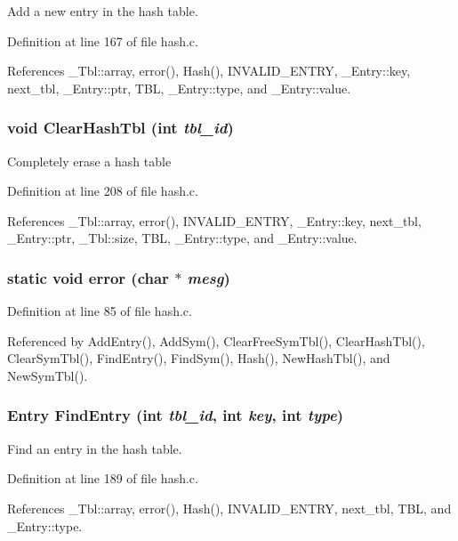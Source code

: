 Add a new entry in the hash table. 

Definition at line 167 of file hash.c.

References \_\-Tbl::array, error(), Hash(), INVALID\_\-ENTRY, \_\-Entry::key, next\_\-tbl, \_\-Entry::ptr, TBL, \_\-Entry::type, and \_\-Entry::value.
\subsubsection{\setlength{\rightskip}{0pt plus 5cm}void Clear\-Hash\-Tbl (int {\em tbl\_\-id})}\label{hash_8c_5004e15212d23633bcb473d8167f2ce9}


Completely erase a hash table 

Definition at line 208 of file hash.c.

References \_\-Tbl::array, error(), INVALID\_\-ENTRY, \_\-Entry::key, next\_\-tbl, \_\-Entry::ptr, \_\-Tbl::size, TBL, \_\-Entry::type, and \_\-Entry::value.
\subsubsection{\setlength{\rightskip}{0pt plus 5cm}static void error (char $\ast$ {\em mesg})\hspace{0.3cm}{\tt  [static]}}\label{hash_8c_ee4e896cda242224d1a22f98709fcb89}




Definition at line 85 of file hash.c.

Referenced by Add\-Entry(), Add\-Sym(), Clear\-Free\-Sym\-Tbl(), Clear\-Hash\-Tbl(), Clear\-Sym\-Tbl(), Find\-Entry(), Find\-Sym(), Hash(), New\-Hash\-Tbl(), and New\-Sym\-Tbl().
\subsubsection{\setlength{\rightskip}{0pt plus 5cm}\bf{Entry} Find\-Entry (int {\em tbl\_\-id}, int {\em key}, int {\em type})}\label{hash_8c_7f132fbd09fb46c0324910a2241fc647}


Find an entry in the hash table. 

Definition at line 189 of file hash.c.

References \_\-Tbl::array, error(), Hash(), INVALID\_\-ENTRY, next\_\-tbl, TBL, and \_\-Entry::type.
